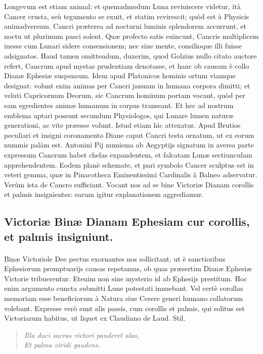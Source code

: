 \documentclass[a4paper, 11pt, oneside, polutonikogreek, latin]{article}
\begin{document}
Longevum est etiam animal: et quemadmodum Luna reviuiscere videtur, ità Cancer crusta, seù tegumento se exuit, et statim revirescit; quòd est à Physicis animadversum. Cancri præterea ad nocturni luminis splendorem accurrunt, et noctu ut plurimum pasci solent. Quæ profecto satis euincunt, Cancris multiplicem inesse cum Lunari sidere consensionem; nec sine mente, consilioque illi fuisse adsignatos. Haud tamen omittendum, duxerim, quod Golzius nullo citato auctore refert, Cancrum apud mystas prudentiam denotasse, et hanc ob causam è collo Dianæ Ephesiæ suspensum. Idem apud Platonicos hominis ortum viamque designat: volunt enim animas per Cancri januam in humana corpora dimitti; et veluti Capricornum Deorum, sic Cancrum hominum portam vocant, quòd per eam egredientes animæ humanum in corpus transeant. Et hec ad nostrum emblema aptari possunt secundum Physiologos, qui Lunare lumen naturæ generationi, ac vite præesse volunt. Istud etiam hìc attexatur. Apud Brutios peculiari et insigni coronamento Diane caput Cancri testa ornatum, ut ex eorum nummis palàm est. Antonini Pij numisma ab Aegyptijs signatum in aversa parte expressum Cancrum habet chelas expandentem, et falcatam Lunæ sectiunculam apprehendentem. Eodem planè schemate, et pari symbolo Cancer sculptus est in veteri gemma, quæ in Pinacotheca Eminentissimi Cardinalis à Balneo adservatur. Verùm ista de Cancro sufficiant. Vocant nos ad se bine Victoriæ Dianam corollis et palmis insignientes: earum igitur explanationem aggrediamur.
\clearpage
\subsection{Victoriæ Binæ Dianam Ephesiam cur corollis, et palmis insigniunt.}
\paragraph{}
Binæ Victoriole Dee pectus exornantes nos sollicitant, ut è sanctioribus Ephesiorum promptuarijs causas repetamus, ob quas præsertim Dianæ Ephesiæ Victorie tribuerentur. Etenim non sine mysterio id ab Ephesijs prestitum. Hoc enim argumento cuncta submitti Lune potestati innuebant. Vel certè corollas memoriam esse beneficiorum à Natura siue Cerere generi humano collatorum volebant. Expresse verò sunt alis passis, cum corollis et palmis, qui solitus est Victoriarum habitus, ut liquet ex Claudiano de Laud. Stil.
\begin{quote}
\emph{Illa duci sacras victori panderet alas,}\\
\emph{Et palma viridi gaudens.}\\
\end{quote}
\end{document}
